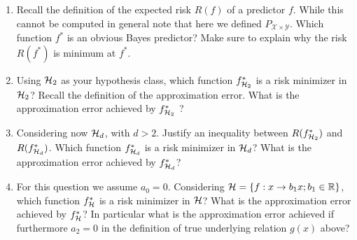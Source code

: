 \documentclass{article}
\newcommand{\bb}{b}
\begin{document}
\begin{enumerate}
    \item Recall the definition of the expected risk $R(f)$ of a predictor $f$. While this cannot be computed in general note that here we defined $P_{\mathcal{X} \times \mathcal{Y}}$. Which function $f^*$ is an obvious Bayes predictor? Make sure to explain why the risk $R(f^*)$ is minimum at $f^*$.

    \item Using ${\mathcal{H}}_2$ as your hypothesis class, which function $f^*_{{\mathcal{H}}_2}$ is a risk minimizer in ${\mathcal{H}}_2$? Recall the definition of the approximation error. What is the approximation error achieved by $f^*_{{\mathcal{H}}_2}$ ?


    \item Considering now ${\mathcal{H}}_d$, with $d>2$. Justify an inequality between $R(f^*_{{\mathcal{H}}_2})$ and $R(f^*_{{\mathcal{H}}_d})$. Which function $f^*_{{\mathcal{H}}_d}$ is a risk minimizer in ${\mathcal{H}}_d$? What is the approximation error achieved by $f^*_{{\mathcal{H}}_d}$?

    
    \item For this question we assume $a_0 = 0$. Considering $\gH= \left\{f: x \rightarrow \bb_1 x;  \bb_1 \in \sR\right\}$, which function $f^*_{{\mathcal{H}}}$ is a risk minimizer in ${\mathcal{H}}$? What is the approximation error achieved by $f^*_{{\mathcal{H}}}$? In particular what is the approximation error achieved if furthermore $a_2=0$ in the definition of true underlying relation $g(x)$ above?

\setcounter{saveenum}{\value{enumi}}
\end{enumerate}
\end{document}
